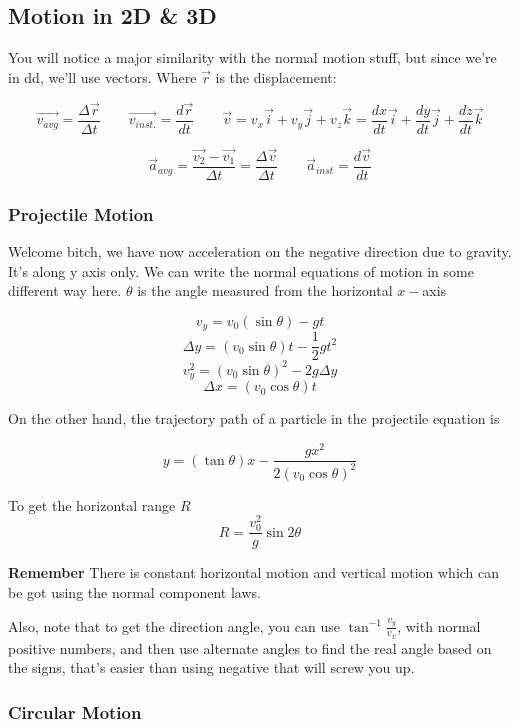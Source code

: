 \documentclass{article}
\begin{document}
\newpage

\subsection{Motion in 2D \& 3D}

You will notice a major similarity with the normal motion stuff, but since we're in dd, we'll use vectors. Where $ \vec{ r } $ is the displacement:

\[
	\vec{ v_{avg} } = \frac{ \varDelta \vec{ r } }{ \varDelta t } 
	\qquad  
	\vec{ v_{inst.} } = \frac{ d \vec{ r } }{ dt } \qquad \vec{ v } = v_x \vec{ i } + v_y \vec{ j } + v_z \vec{ k } = \frac{dx}{dt} \vec{ i } + \frac{dy}{dt} \vec{ j } + \frac{dz}{dt} \vec{ k }
\]

\[
	\vec{ a }_{avg} = \frac{ \vec{ v_2 } -  \vec{ v_1} } { \varDelta t	 } = \frac{ \varDelta	\vec{ v } }{ \varDelta t }
	\qquad \vec{ a }_{inst} = \frac{ d \vec{ v } }{ dt } 
\]

\subsubsection{Projectile Motion}
Welcome bitch, we have now acceleration on the negative direction due to gravity. It's along y axis only. We can write the normal equations of motion in some different way here. $ \theta $ is the angle measured from the horizontal $ x-$axis 

\[	v_y = v_0 ( \sin{ \theta }  ) - g t \]
\[	\varDelta y = (v_0 \sin{\theta}) t - \frac{ 1 }{ 2 } g t^2 \]
\[ v_y^2 = (v_0 \sin{\theta})^2 - 2 g \varDelta y \]
\[
	\varDelta x = (v_0 \cos{\theta}) t	
\]

On the other hand, the trajectory path of a particle in the projectile equation is

\[
	y = ( \tan{ \theta } )x - \frac{ gx^2 }{ 2(v_0 \cos{ \theta } )^2  } 
\]

To get the horizontal range $R$ 
\[
	R = \frac{ v_0^2 }{g  } \sin{ 2 \theta }  
\]

\textbf{Remember} There is constant horizontal motion and vertical motion which can be got using the normal component laws. 


Also, note that to get the direction angle, you can use $ \tan^{-1}{ \frac{v_y}{v_x} } $, with normal positive numbers, and then use alternate angles to find the real angle based on the signs, that's easier than using negative that will screw you up.

\subsubsection{Circular Motion}
\end{document}
